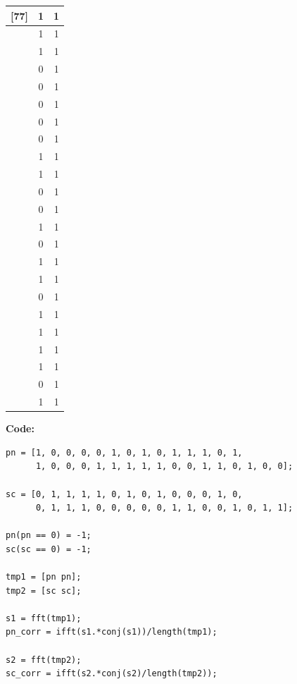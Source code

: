 \documentclass{article}
\begin{document}
\begin{center}
\begin{tabular}{c|c|c}
  [77]	&	1 & 1 \\ \hline
  [78]	&	1 & 1 \\ \hline
  [79]	&	1 & 1 \\ \hline
  [80]	&	0 & 1 \\ \hline
  [81]	&	0 & 1 \\ \hline
  [82]	&	0 & 1 \\ \hline
  [83]	&	0 & 1 \\ \hline
  [84]	&	0 & 1 \\ \hline
  [85]	&	1 & 1 \\ \hline
  [86]	&	1 & 1 \\ \hline
  [87]	&	0 & 1 \\ \hline
  [88]	&	0 & 1 \\ \hline
  [89]	&	1 & 1 \\ \hline
  [90]	&	0 & 1 \\ \hline
  [91]	&	1 & 1 \\ \hline
  [92]	&	1 & 1 \\ \hline
  [93]	&	0 & 1 \\ \hline
  [94]	&	1 & 1 \\ \hline
  [95]	&	1 & 1 \\ \hline
  [96]	&	1 & 1 \\ \hline
  [97]	&	1 & 1 \\ \hline
  [98]	&	0 & 1 \\ \hline
  [99]	&	1 & 1 \\ \hline
\end{tabular}
\end{center}

\textbf{Code:}

\begin{verbatim}
pn = [1, 0, 0, 0, 0, 1, 0, 1, 0, 1, 1, 1, 0, 1, 
      1, 0, 0, 0, 1, 1, 1, 1, 1, 0, 0, 1, 1, 0, 1, 0, 0];

sc = [0, 1, 1, 1, 1, 0, 1, 0, 1, 0, 0, 0, 1, 0, 
      0, 1, 1, 1, 0, 0, 0, 0, 0, 1, 1, 0, 0, 1, 0, 1, 1];

pn(pn == 0) = -1;
sc(sc == 0) = -1;

tmp1 = [pn pn];
tmp2 = [sc sc];

s1 = fft(tmp1);
pn_corr = ifft(s1.*conj(s1))/length(tmp1);

s2 = fft(tmp2);
sc_corr = ifft(s2.*conj(s2)/length(tmp2));
\end{verbatim}
\end{document}
